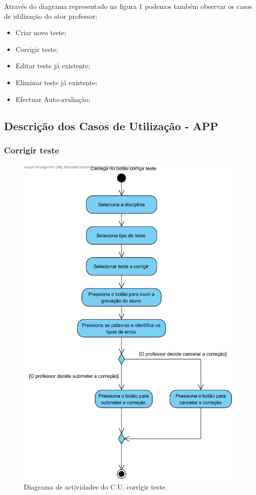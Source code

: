 \documentclass[a4paper]{article}
\begin{document}
			Através do diagrama representado na figura 1 podemos também observar os casos de utilização do ator professor:
			\begin{itemize}
				\item	Criar novo teste;
				\item   Corrigir teste;
				\item 	Editar teste já existente;
				\item 	Eliminar teste já existente;
				\item   Efectuar Auto-avaliação;
			\end{itemize}
			
			\newpage
			
			\subsection{Descrição dos Casos de Utilização - APP}
					\subsubsection{Corrigir teste}
					\begin{figure}[h]
						\centering
						\includegraphics[width=0.7\linewidth]{./diagramasAnaliseSistemas/CorrigirTeste}
						\caption{Diagrama de actividades do C.U. corrigir teste.}
						\label{fig:CorrigirTeste}
					\end{figure}
\end{document}
